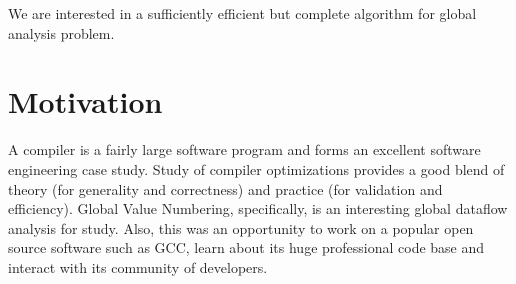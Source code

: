 We are interested in a sufficiently efficient but complete algorithm for global analysis problem.

\section{Motivation}
A compiler is a fairly large software program and forms an excellent software engineering case study. Study of compiler optimizations provides a good blend of theory (for generality and correctness) and practice (for validation and efficiency). Global Value Numbering, specifically, is an interesting global dataflow analysis for study. Also, this was an opportunity to work on a popular open source software such as GCC, learn about its huge professional code base and interact with its community of developers.
